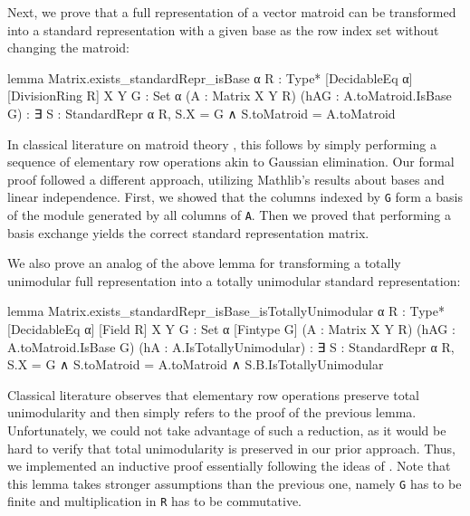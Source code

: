 Next, we prove that a full representation of a vector matroid can be transformed into a standard representation with a given base as the row index set without changing the matroid:
\begin{leancode}
lemma Matrix.exists_standardRepr_isBase
    {α R : Type*} [DecidableEq α] [DivisionRing R]
    {X Y G : Set α} (A : Matrix X Y R)
    (hAG : A.toMatroid.IsBase G) :
    ∃ S : StandardRepr α R,
      S.X = G ∧
      S.toMatroid = A.toMatroid
\end{leancode}
In classical literature on matroid theory \cite{Oxley2011,Truemper2016}, this follows by simply performing a sequence of elementary row operations akin to Gaussian elimination. Our formal proof followed a different approach, utilizing Mathlib's results about bases and linear independence. First, we showed that the columns indexed by \texttt{G} form a basis of the module generated by all columns of \texttt{A}. Then we proved that performing a basis exchange yields the correct standard representation matrix.

We also prove an analog of the above lemma for transforming a totally unimodular full representation into a totally unimodular standard representation:
\begin{leancode}
lemma Matrix.exists_standardRepr_isBase_isTotallyUnimodular
    {α R : Type*} [DecidableEq α] [Field R]
    {X Y G : Set α} [Fintype G]
    (A : Matrix X Y R)
    (hAG : A.toMatroid.IsBase G)
    (hA : A.IsTotallyUnimodular) :
    ∃ S : StandardRepr α R,
      S.X = G ∧
      S.toMatroid = A.toMatroid ∧
      S.B.IsTotallyUnimodular
\end{leancode}
Classical literature \cite{Oxley2011,Truemper2016} observes that elementary row operations preserve total unimodularity and then simply refers to the proof of the previous lemma. Unfortunately, we could not take advantage of such a reduction, as it would be hard to verify that total unimodularity is preserved in our prior approach. Thus, we implemented an inductive proof essentially following the ideas of \cite{Oxley2011,Truemper2016}. Note that this lemma takes stronger assumptions than the previous one, namely \texttt{G} has to be finite and multiplication in \texttt{R} has to be commutative.

